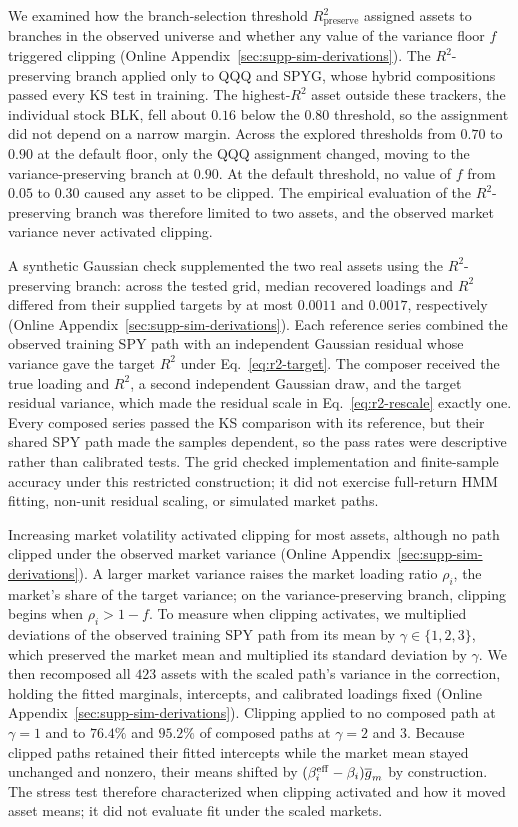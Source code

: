 We examined how the branch-selection threshold
$R^2_{\mathrm{preserve}}$ assigned assets to branches in the observed
universe and whether any value of the variance floor $f$ triggered
clipping (Online Appendix~\ref{sec:supp-sim-derivations}). The
$R^2$-preserving branch applied only to QQQ and SPYG, whose hybrid
compositions passed every KS test in training. The highest-$R^2$ asset
outside these trackers, the individual stock BLK, fell about $0.16$
below the $0.80$ threshold, so the assignment did not depend on a
narrow margin. Across the explored thresholds from $0.70$ to $0.90$ at
the default floor, only the QQQ assignment changed, moving to the
variance-preserving branch at $0.90$. At the default threshold, no
value of $f$ from $0.05$ to $0.30$ caused any asset to be clipped. The
empirical evaluation of the $R^2$-preserving branch was therefore
limited to two assets, and the observed market variance never
activated clipping.

A synthetic Gaussian check supplemented the two real assets using
the $R^2$-preserving branch: across the tested grid, median recovered
loadings and $R^2$ differed from their supplied targets by at most
$0.0011$ and $0.0017$, respectively (Online Appendix~\ref{sec:supp-sim-derivations}).
Each reference series combined the observed training SPY path with an
independent Gaussian residual whose variance gave the target $R^2$
under Eq.~\eqref{eq:r2-target}. The composer received the true
loading and $R^2$, a second independent Gaussian draw, and the target
residual variance, which made the residual scale in
Eq.~\eqref{eq:r2-rescale} exactly one. Every composed series passed
the KS comparison with its reference, but their shared SPY path made
the samples dependent, so the pass rates were descriptive rather than
calibrated tests. The grid checked implementation and finite-sample
accuracy under this restricted construction; it did not exercise
full-return HMM fitting, non-unit residual scaling, or simulated
market paths.

Increasing market volatility activated clipping for most assets,
although no path clipped under the observed market variance
(Online Appendix~\ref{sec:supp-sim-derivations}). A larger market variance raises the market
loading ratio $\rho_i$, the market's share of the target variance;
on the variance-preserving branch, clipping begins when
$\rho_i>1-f$. To measure when clipping activates, we
multiplied deviations of the observed training SPY path from its mean
by $\gamma\in\{1,2,3\}$, which preserved the market mean and
multiplied its standard deviation by $\gamma$. We then recomposed all
$423$ assets with the scaled path's variance in the correction,
holding the fitted marginals, intercepts, and calibrated loadings
fixed (Online Appendix~\ref{sec:supp-sim-derivations}). Clipping applied to no composed path
at $\gamma=1$ and to $76.4\%$ and $95.2\%$ of composed paths at
$\gamma=2$ and $3$. Because clipped paths retained their fitted
intercepts while the market mean stayed unchanged and nonzero, their
means shifted by $(\beta_i^{\mathrm{eff}}-\beta_i)\overline{g}_m$ by
construction. The stress test therefore characterized when clipping
activated and how it moved asset means; it did not evaluate fit under
the scaled markets.
